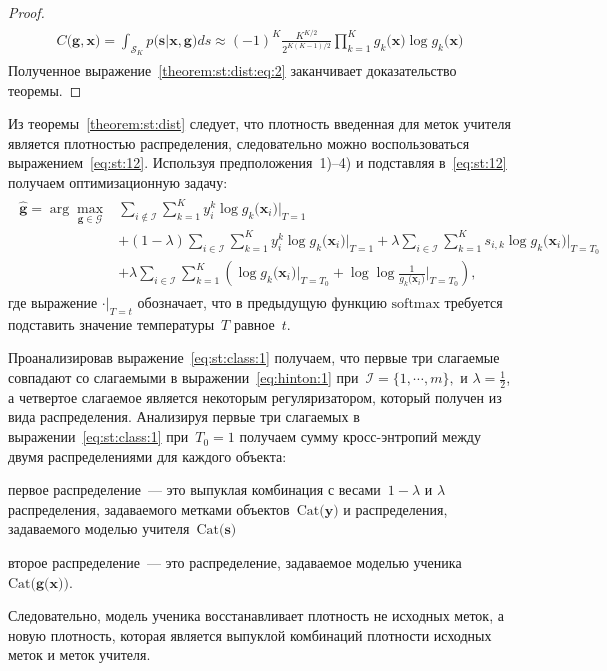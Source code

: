 \documentclass[12pt]{a&t}
\begin{document}
\begin{proof}
	\begin{gather}
	\label{theorem:st:dist:eq:2}
	\begin{aligned}
		C\bigr(\mathbf{g}, \mathbf{x}\bigr) = \int_{\mathcal{S}_K}p\bigr(\mathbf{s}|\mathbf{x}, \mathbf{g}\bigr)ds \approx \left(-1\right)^{K}\frac{K^{K/2}}{2^{K(K-1)/2}}\prod_{k=1}^{K}g_k\bigr(\mathbf{x}\bigr)\log g_k\bigr(\mathbf{x}\bigr)
	\end{aligned}
	\end{gather}
Полученное выражение~\eqref{theorem:st:dist:eq:2} заканчивает доказательство теоремы.
\end{proof}

Из теоремы~\ref{theorem:st:dist} следует, что плотность введенная для меток учителя является плотностью распределения, следовательно можно воспользоваться выражением~\eqref{eq:st:12}.
Используя предположения~1)--4) и подставляя в~\eqref{eq:st:12} получаем  оптимизационную задачу:
\begin{gather}
\label{eq:st:class:1}
\begin{aligned}
\hat{\mathbf{g}} = \arg\max_{\mathbf{g}\in \mathcal{G}} & \sum_{i\not\in \mathcal{I}}\sum_{k=1}^{K}y_i^k\log g_k\bigr(\mathbf{x}_i\bigr)\bigr|_{T=1} \\
&+ \left(1-\lambda\right)\sum_{i\in \mathcal{I}}\sum_{k=1}^{K}y_i^k\log g_k\bigr(\mathbf{x}_i\bigr)\bigr|_{T=1} + \lambda\sum_{i\in \mathcal{I}}\sum_{k=1}^{K}s_{i,k}\log g_k\bigr(\mathbf{x}_i\bigr)\bigr|_{T=T_0} \\
&+ \lambda \sum_{i\in \mathcal{I}}\sum_{k=1}^{K}\left(\log g_k\bigr(\mathbf{x}_i\bigr)\bigr|_{T=T_0} + \log\log\frac{1}{g_k\bigr(\mathbf{x}_i\bigr)}\bigr|_{T=T_0}\right),
\end{aligned}
\end{gather}
где выражение $\cdot\bigr|_{T=t}$ обозначает, что в предыдущую функцию $\text{softmax}$ требуется подставить значение температуры~$T$ равное~$t$.

Проанализировав выражение~\eqref{eq:st:class:1} получаем, что первые три слагаемые совпадают со слагаемыми в выражении~\eqref{eq:hinton:1} при~$\mathcal{I} = \{1, \cdots, m\},$ и $\lambda=\frac{1}{2}$, а четвертое слагаемое является некоторым регуляризатором, который получен из вида распределения. Анализируя первые три слагаемых в выражении~\eqref{eq:st:class:1} при~$T_0 = 1$ получаем сумму кросс-энтропий между двумя распределениями для каждого объекта:
\begin{enumlist}
	\item первое распределение~--- это выпуклая комбинация с весами~$1-\lambda$ и $\lambda$ распределения, задаваемого метками объектов~$\text{Cat}\bigr(\mathbf{y}\bigr)$ и распределения, задаваемого моделью учителя~$\text{Cat}\bigr(\mathbf{s}\bigr)$
	\item второе распределение~--- это распределение, задаваемое моделью ученика~$\text{Cat}\bigr(\mathbf{g}\bigr(\mathbf{x}\bigr)\bigr)$.
\end{enumlist}
Следовательно, модель ученика восстанавливает плотность не исходных меток, а новую плотность, которая является выпуклой комбинаций плотности исходных меток и меток учителя.
\end{document}
